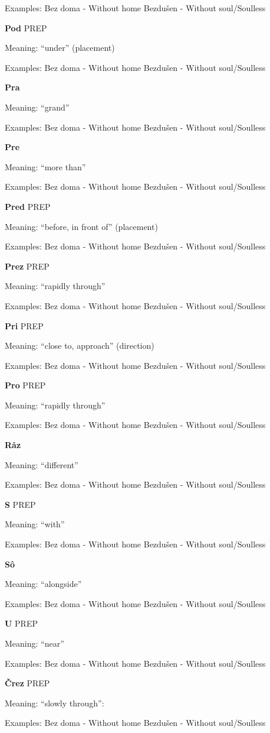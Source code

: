 Examples:
Bez doma - Without home
Bezdušen - Without soul/Soulless 

\textbf{Pod} PREP

Meaning: “under” (placement)

Examples:
Bez doma - Without home
Bezdušen - Without soul/Soulless 

\textbf{Pra}

Meaning: “grand”

Examples:
Bez doma - Without home
Bezdušen - Without soul/Soulless 

\textbf{Pre}

Meaning: “more than”

Examples:
Bez doma - Without home
Bezdušen - Without soul/Soulless 

\textbf{Pred} PREP

Meaning: “before, in front of” (placement)

Examples:
Bez doma - Without home
Bezdušen - Without soul/Soulless 

\textbf{Prez} PREP

Meaning: “rapidly through”

Examples:
Bez doma - Without home
Bezdušen - Without soul/Soulless 


\textbf{Pri} PREP

Meaning: “close to, approach” (direction)

Examples:
Bez doma - Without home
Bezdušen - Without soul/Soulless 

\textbf{Pro} PREP

Meaning: “rapidly through”

Examples:
Bez doma - Without home
Bezdušen - Without soul/Soulless 

\textbf{Råz}

Meaning: “different”

Examples:
Bez doma - Without home
Bezdušen - Without soul/Soulless 

\textbf{S} PREP

Meaning: “with”

Examples:
Bez doma - Without home
Bezdušen - Without soul/Soulless 

\textbf{Sô}

Meaning: “alongside”

Examples:
Bez doma - Without home
Bezdušen - Without soul/Soulless 

\textbf{U} PREP

Meaning: “near”

Examples:
Bez doma - Without home
Bezdušen - Without soul/Soulless 

\textbf{Črez} PREP

Meaning: “slowly through”:

Examples:
Bez doma - Without home
Bezdušen - Without soul/Soulless 

